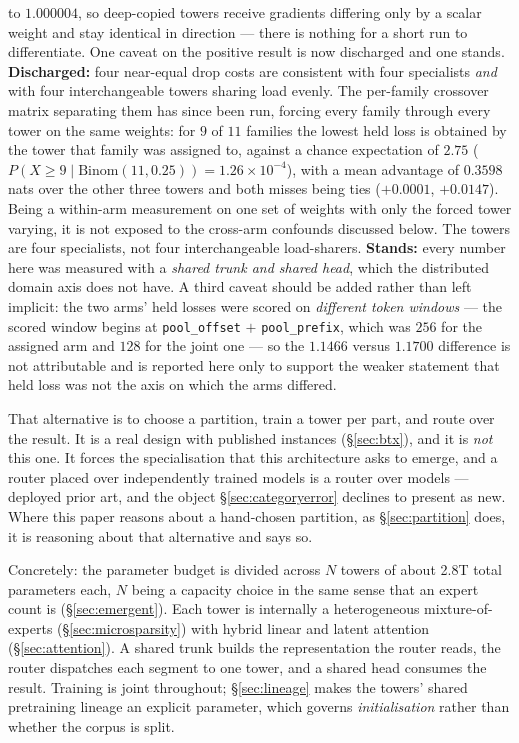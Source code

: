 \documentclass[11pt]{article}
\begin{document}
to $1.000004$, so deep-copied towers receive gradients differing only by a scalar weight and stay identical in direction --- there is nothing for a short run to differentiate. One caveat on the positive result is now discharged and one stands. \textbf{Discharged:} four near-equal drop costs are consistent with four specialists \emph{and} with four interchangeable towers sharing load evenly. The per-family crossover matrix separating them has since been run, forcing every family through every tower on the same weights: for $9$ of $11$ families the lowest held loss is obtained by the tower that family was assigned to, against a chance expectation of $2.75$ ($P(X \geq 9 \mid \mathrm{Binom}(11, 0.25)) = 1.26\times10^{-4}$), with a mean advantage of $0.3598$ nats over the other three towers and both misses being ties ($+0.0001$, $+0.0147$). Being a within-arm measurement on one set of weights with only the forced tower varying, it is not exposed to the cross-arm confounds discussed below. The towers are four specialists, not four interchangeable load-sharers. \textbf{Stands:} every number here was measured with a \emph{shared trunk and shared head}, which the distributed domain axis does not have. A third caveat should be added rather than left implicit: the two arms' held losses were scored on \emph{different token windows} --- the scored window begins at \texttt{pool\_offset} $+$ \texttt{pool\_prefix}, which was $256$ for the assigned arm and $128$ for the joint one --- so the $1.1466$ versus $1.1700$ difference is not attributable and is reported here only to support the weaker statement that held loss was not the axis on which the arms differed.

That alternative is to choose a partition, train a tower per part, and route over the result. It is a real design with published instances (\S\ref{sec:btx}), and it is \emph{not} this one. It forces the specialisation that this architecture asks to emerge, and a router placed over independently trained models is a router over models --- deployed prior art, and the object \S\ref{sec:categoryerror} declines to present as new. Where this paper reasons about a hand-chosen partition, as \S\ref{sec:partition} does, it is reasoning about that alternative and says so.

Concretely: the parameter budget is divided across $N$ towers of about 2.8T total parameters each, $N$ being a capacity choice in the same sense that an expert count is (\S\ref{sec:emergent}). Each tower is internally a heterogeneous mixture-of-experts (\S\ref{sec:microsparsity}) with hybrid linear and latent attention (\S\ref{sec:attention}). A shared trunk builds the representation the router reads, the router dispatches each segment to one tower, and a shared head consumes the result. Training is joint throughout; \S\ref{sec:lineage} makes the towers' shared pretraining lineage an explicit parameter, which governs \emph{initialisation} rather than whether the corpus is split.
\end{document}

